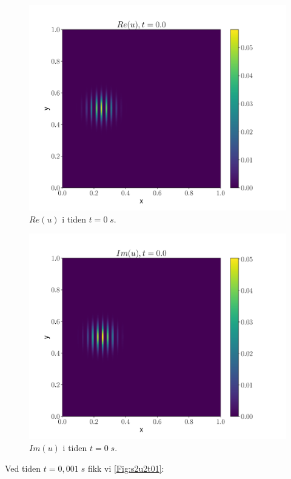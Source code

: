 \documentclass[reprint,english,notitlepage]{revtex4-2}  %
\begin{document}
\begin{figure}[H]
\centering
\includegraphics[scale=0.45, trim={3cm 0 0 0}]{../Images/ImshowRe00sl1.pdf}
\caption{$Re(u) $ i tiden $t = 0 \; s$.}
\label{Fig:s2u2t0Re}
\end{figure}


\begin{figure}[H]
\centering
\includegraphics[scale=0.45, trim={3cm 0 0 0}]{../Images/ImshowIm00sl1.pdf}
\caption{$Im(u) $ i tiden $t = 0 \; s$.}
\label{Fig:s2u2t0Im}
\end{figure}


Ved tiden $t = 0,001 \; s$ fikk vi \autoref{Fig:s2u2t01}:
\end{document}
